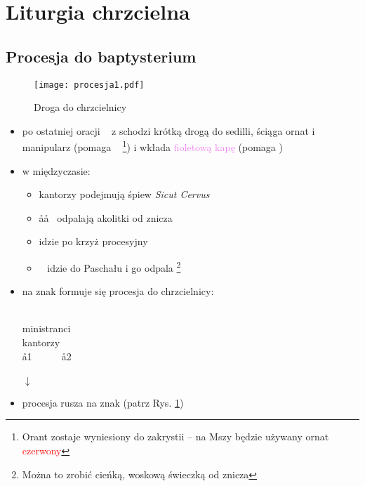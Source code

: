\section{Liturgia chrzcielna}

\subsection{Procesja do baptysterium}
\begin{figure}[h]
	\centering
	\texttt{[image: procesja1.pdf]}
	\caption{Droga do chrzcielnicy}
	\label{fig:procesja1}
\end{figure}
\begin{itemize}
	\item po ostatniej oracji \ii~ z  schodzi krótką drogą do sedilli,
	      ściąga ornat i manipularz (pomaga \zz~ \footnote{Orant zostaje
		      wyniesiony do zakrystii -- na Mszy będzie używany ornat
		      \textcolor{red}{czerwony}}) i wkłada \textcolor{violet}{fioletową
		      kapę} (pomaga )
	\item w międzyczasie:
	      \begin{itemize}
		      \item kantorzy podejmują śpiew \textit{Sicut Cervus}
		      \item \aa\aa~ odpalają akolitki od znicza
		      \item {} idzie po krzyż procesyjny
		      \item \paschal~ idzie do Paschału i go odpala \footnote{Można to
			            zrobić cieńką, woskową świeczką od znicza}
	      \end{itemize}
	\item na znak  formuje się procesja do chrzcielnicy:
	      \begin{center}
		      ~~~\ii~~~ \smallskip\\
		      ministranci \smallskip\\
		      kantorzy \smallskip\\
		      \aa1~~~~~~\aa2 \smallskip\\
		      ~~\paschal~~~~~~~ \smallskip\\
		      $\downarrow$
	      \end{center}
	\item procesja rusza na znak  (patrz Rys. \ref{fig:procesja1})
\end{itemize}
